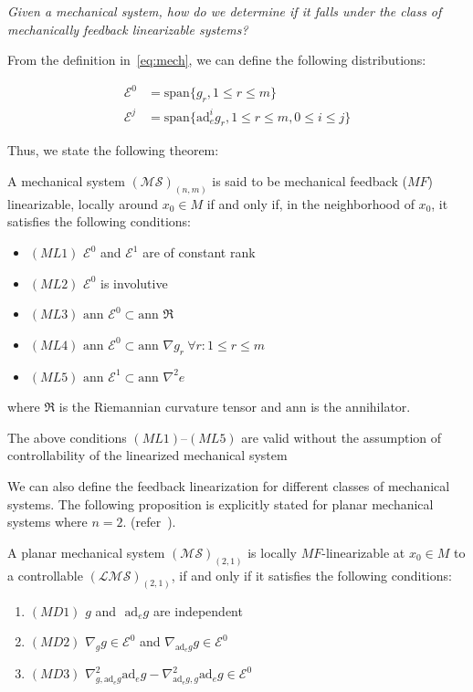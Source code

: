 \textsl{Given a mechanical system, how do we determine if it falls under the class of mechanically feedback linearizable systems?}

From the definition in~\eqref{eq:mech}, we can define the following distributions:

\begin{equation}
    \begin{split}
        \mathcal{E}^0 & = \text{span} \{ g_r, 1 \leq r \leq m \} \\
        \mathcal{E}^j & = \text{span} \{ \text{ad}^i_e g_r, 1 \leq r \leq m, 0 \leq i \leq j \}
    \end{split}
\end{equation}

Thus, we state the following theorem:
\begin{thm}\label{thm:mfl}
    A mechanical system $(\mathcal{MS})_{(n,m)}$ is said to be mechanical feedback ($MF$) linearizable, locally around $x_0 \in M$ if and only if, in the neighborhood of $x_0$, it satisfies the following conditions:

    \begin{itemize}
        \item $(ML1)$ $\mathcal{E}^0$ and $\mathcal{E}^1$ are of constant rank
        \item $(ML2)$ $\mathcal{E}^0$ is involutive
        \item $(ML3)$ $\text{ann } \mathcal{E}^{0} \subset \text{ann } \mathfrak{R}$
        \item $(ML4)$ $\text{ann } \mathcal{E}^0 \subset \text{ann } \nabla g_r \ \forall r: 1 \leq r \leq m$
        \item $(ML5)$ $\text{ann } \mathcal{E}^1 \subset \text{ann } \nabla^2 e$
    \end{itemize}
where $\mathfrak{R}$ is the Riemannian curvature tensor and $\text{ann}$ is the annihilator.
\end{thm}

\begin{rmk}
    The above conditions $(ML1)$--$(ML5)$ are valid without the assumption of controllability of the linearized mechanical system
\end{rmk}

We can also define the feedback linearization for different classes of mechanical systems. The following proposition is explicitly stated for planar mechanical systems where $n=2$. (refer~\cite{nowicki}).

\begin{prop}
\label{prop:planar_mech}
A planar mechanical system $\mathcal{(MS)}_{(2,1)}$ is locally $MF$-linearizable at $x_0 \in M$ to a controllable $\mathcal{(LMS)}_{(2,1)}$, if and only if it satisfies the following conditions:
\begin{enumerate}
    \item $(MD1)$ $g$ and $\text{ ad}_e g$ are independent
    \item $(MD2)$ $\nabla_g g \in \mathcal{E}^0$ and $\nabla_{\text{ad}_e g} g \in \mathcal{E}^0$
    \item $(MD3)$ $\nabla^2_{g, \text{ad}_e g} \text{ad}_e g - \nabla^2_{\text{ad}_e g, g} \text{ad}_e g \in \mathcal{E}^0$
\end{enumerate}
\end{prop}